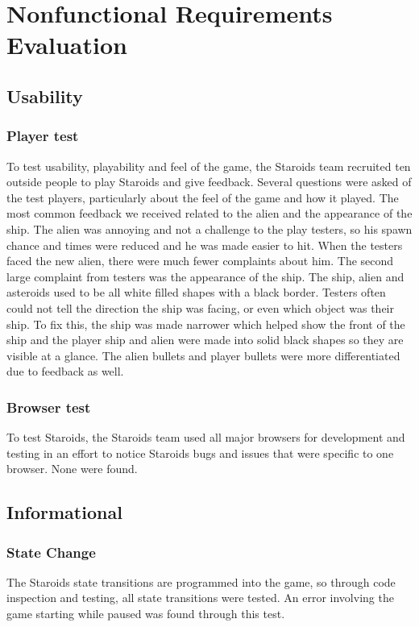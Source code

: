 \documentclass[12pt, titlepage]{article}
\begin{document}
\section{Nonfunctional Requirements Evaluation}

\subsection{Usability}

\subsubsection{Player test}
To test usability, playability and feel of the game, the Staroids team recruited ten outside people to play Staroids and give feedback. Several questions were asked of the test players, particularly about the feel of the game and how it played. The most common feedback we received related to the alien and the appearance of the ship. The alien was annoying and not a challenge to the play testers, so his spawn chance and times were reduced and he was made easier to hit. When the testers faced the new alien, there were much fewer complaints about him. The second large complaint from testers was the appearance of the ship. The ship, alien and asteroids used to be all white filled shapes with a black border. Testers often could not tell the direction the ship was facing, or even which object was their ship. To fix this, the ship was made narrower which helped show the front of the ship and the player ship and alien were made into solid black shapes so they are visible at a glance. The alien bullets and player bullets were more differentiated due to feedback as well.\\

\subsubsection{Browser test}
To test Staroids, the Staroids team used all major browsers for development and testing in an effort to notice Staroids bugs and issues that were specific to one browser. None were found.\\

\subsection{Informational}

\subsubsection{State Change}
The Staroids state transitions are programmed into the game, so through code inspection and testing, all state transitions were tested. An error involving the game starting while paused was found through this test.
\end{document}
